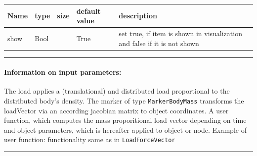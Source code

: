 \begin{center}
  \footnotesize
  \begin{longtable}{| p{4.5cm} | p{2.5cm} | p{0.5cm} | p{2.5cm} | p{6cm} |}
    \hline
    \bf Name & \bf type & \bf size & \bf default value & \bf description \\ \hline
    show &     Bool &      &     True &     set true, if item is shown in visualization and false if it is not shown\\ \hline
	  \end{longtable}
	\end{center}
\par\noindent\rule{\textwidth}{0.4pt}
\label{description_LoadMassProportional}
\paragraph{Information on input parameters:} 
\finishTable
 \noindent
    The load applies a (translational) and distributed load proportional to the distributed body's density.
    The marker of type \texttt{MarkerBodyMass} transforms the loadVector via an according jacobian matrix to object coordinates.
    A user function, which computes the mass proporitional load vector depending on time and object parameters, which is hereafter applied to object or node.
    \finishTable
    Example of user function: functionality same as in \texttt{LoadForceVector}
\vspace{6pt}\par\noindent\rule{\textwidth}{0.4pt}
\label{miniExample_LoadMassProportional}
